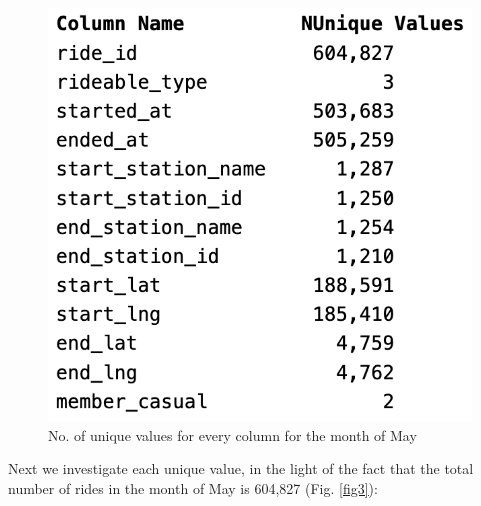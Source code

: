 \documentclass[12pt]{article}
\begin{document}
	\begin{figure}[h]
	\centering
	\includegraphics[scale = 0.6]{imgUni.png} 
	\caption{No. of unique values for every column for the month of May}
	\label{fig2}
	\end{figure}
Next we investigate each unique value, in the light of the fact that the total number of rides in the month of May is 604,827  (Fig. \underline{\ref{fig3}}):
\end{document}

